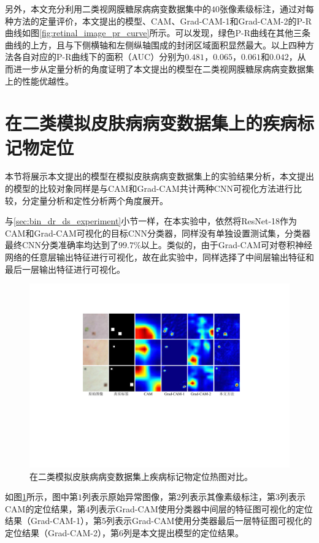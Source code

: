 另外，本文充分利用二类视网膜糖尿病病变数据集中的$40$张像素级标注，通过对每种方法的定量评价，本文提出的模型、CAM、Grad-CAM-1和Grad-CAM-2的P-R曲线如图\ref{fig:retinal_image_pr_curve}所示。可以发现，绿色P-R曲线在其他三条曲线的上方，且与下侧横轴和左侧纵轴围成的封闭区域面积显然最大。以上四种方法各自对应的P-R曲线下的面积（AUC）分别为$0.481$，$0.065$，$0.061$和$0.042$，从而进一步从定量分析的角度证明了本文提出的模型在二类视网膜糖尿病病变数据集上的性能优越性。

\section{在二类模拟皮肤病病变数据集上的疾病标记物定位}\label{sec:bin_simulated_ds_experiment}
本节将展示本文提出的模型在模拟皮肤病病变数据集上的实验结果分析，本文提出的模型的比较对象同样是与CAM和Grad-CAM共计两种CNN可视化方法进行比较，分定量分析和定性分析两个角度展开。

与\ref{sec:bin_dr_ds_experiment}小节一样，在本实验中，依然将ResNet-18作为CAM和Grad-CAM可视化的目标CNN分类器，同样没有单独设置测试集，分类器最终CNN分类准确率均达到了$99.7\%$以上。类似的，由于Grad-CAM可对卷积神经网络的任意层输出特征进行可视化，故在此实验中，同样选择了中间层输出特征和最后一层输出特征进行可视化。
\begin{figure}[h]
	\centering
	\includegraphics[width=1.0\textwidth]{figure/pr_curve_skin_image.pdf}
	\caption[在二类模拟皮肤病病变数据集上疾病标记物定位热图对比]{在二类模拟皮肤病病变数据集上疾病标记物定位热图对比。} 
	\label{fig:simulated_skin}
\end{figure}

如图\ref{fig:simulated_skin}所示，图中第$1$列表示原始异常图像，第$2$列表示其像素级标注，第$3$列表示CAM的定位结果，第$4$列表示Grad-CAM使用分类器中间层的特征图可视化的定位结果（Grad-CAM-1），第$5$列表示Grad-CAM使用分类器最后一层特征图可视化的定位结果（Grad-CAM-2），第$6$列是本文提出模型的定位结果。

